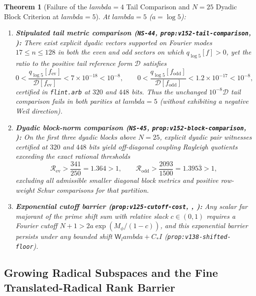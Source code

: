 \documentclass[11pt]{article}
\def\lambda{lambda}%
\newtheorem{theorem}{Theorem}[section]
\theoremstyle{remark}
\begin{document}
\begin{theorem}[Failure of the $\lambda = 4$ Tail Comparison and $N = 25$ Dyadic Block Criterion at $\lambda = 5$]
\label{thm:lambda5-failures}
At $\lambda = 5$ ($a = \log 5$):
\begin{enumerate}[label=(\alph*)]
  \item \textbf{Stipulated tail metric comparison (\texttt{NS-44}, \texttt{prop:v152-tail-comparison}, ):} There exist explicit dyadic vectors supported on Fourier modes $17 \le n \le 128$ in both the even and odd sectors on which $q_{\log 5}[f] > 0$, yet the ratio to the positive tail reference form $\mathcal{D}$ satisfies
  \begin{equation}
    0 < \frac{q_{\log 5}[f_{\mathrm{ev}}]}{\mathcal{D}[f_{\mathrm{ev}}]} < 7 \times 10^{-18} < 10^{-8}, \qquad
    0 < \frac{q_{\log 5}[f_{\mathrm{odd}}]}{\mathcal{D}[f_{\mathrm{odd}}]} < 1.2 \times 10^{-17} < 10^{-8},
  \end{equation}
  certified in \texttt{flint.arb} at $320$ and $448$ bits. Thus the unchanged $10^{-8}\mathcal{D}$ tail comparison fails in both parities at $\lambda = 5$ (without exhibiting a negative Weil direction).
  \item \textbf{Dyadic block-norm comparison (\texttt{NS-45}, \texttt{prop:v152-block-comparison}, ):} On the first three dyadic blocks above $N = 25$, explicit dyadic pair witnesses certified at $320$ and $448$ bits yield off-diagonal coupling Rayleigh quotients exceeding the exact rational thresholds
  \begin{equation}
    \mathcal{R}_{\mathrm{ev}} > \frac{341}{250} = 1.364 > 1, \qquad
    \mathcal{R}_{\mathrm{odd}} > \frac{2093}{1500} = 1.395\overline{3} > 1,
  \end{equation}
  excluding all admissible smaller diagonal block metrics and positive row-weight Schur comparisons for that partition.
  \item \textbf{Exponential cutoff barrier (\texttt{prop:v125-cutoff-cost}, , ):} Any scalar far majorant of the prime shift sum with relative slack $c \in (0,1)$ requires a Fourier cutoff $N + 1 > 2a\exp(M_\phi/(1-c))$, and this exponential barrier persists under any bounded shift $\mathsf{W}_\lambda + C_* I$ (\texttt{prop:v138-shifted-floor}).
\end{enumerate}
\end{theorem}

\subsection{Growing Radical Subspaces and the Fine Translated-Radical Rank Barrier}
\end{document}
